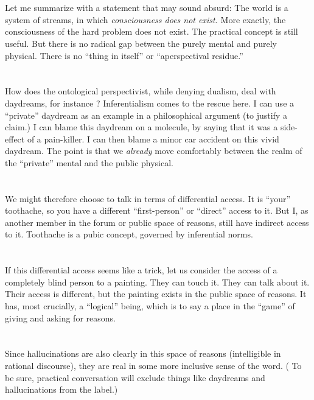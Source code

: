 \documentclass{article}
\renewcommand{\i}{\textit}
\newcommand{\q}{\enquote}
\begin{document}
\begin{huge}
{{\section{}
Let me summarize with a statement that may sound absurd: The world is a system of streams, in which \i{consciousness does not exist.} More exactly, the consciousness of the hard problem does not exist. The practical concept is still useful. But there is no radical gap between the purely mental and purely physical. There is no \q{thing in itself} or \q{aperspectival residue.} 

\section{}
How does the ontological perspectivist, while denying dualism, deal with daydreams, for instance ? Inferentialism comes to the rescue here. I can use a \q{private} daydream as an example in a philosophical argument (to justify a claim.) I can blame this daydream on a molecule, by saying that it was a side-effect of a pain-killer. I can then blame a minor car accident on this vivid daydream. The point is that we \i{already} move comfortably between the realm of the \q{private} mental and the public physical. 

\section{}
We might therefore choose to talk in terms of differential access. It is \q{your} toothache, so you have a different \q{first-person} or \q{direct} access to it. But I, as another member in the forum or public space of reasons, still have indirect access to it. Toothache is a pubic concept, governed by inferential norms. 

\section{}
If this differential access seems like a trick, let us consider the access of a completely blind person to a painting. They can touch it. They can talk about it. Their access is different, but the painting exists in the public space of reasons. It has, most crucially, a \q{logical} being, which is to say a place in the \q{game} of giving and asking for reasons. 


\section{}
Since hallucinations are also clearly in this space of reasons (intelligible in rational discourse), they are real in some more inclusive sense of the word. ( To be sure, practical conversation will exclude things like daydreams and hallucinations from the label.)  

}}
\end{huge}
\end{document}
